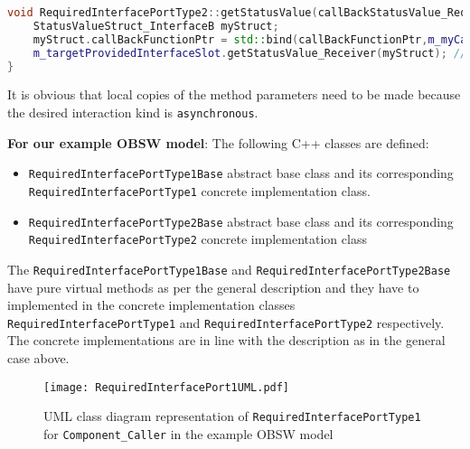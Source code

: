 \begin{Listing}
\begin{lstlisting}[language=C++]
void RequiredInterfacePortType2::getStatusValue(callBackStatusValue_RequiredInterfacePortType2 callBackFunctionPtr) {
	StatusValueStruct_InterfaceB myStruct; 
	myStruct.callBackFunctionPtr = std::bind(callBackFunctionPtr,m_myCallerInstance,std::placeholder::_1);
	m_targetProvidedInterfaceSlot.getStatusValue_Receiver(myStruct); //Simple method call
}
\end{lstlisting}
\caption{Code excerpt from the generated code for interface attribute \texttt{StatusValue} access in \texttt{Required\allowbreak InterfacePort\allowbreak Type2}}
\label{Listing: Required interface port2 Impl}
\end{Listing}

It is obvious that local copies of the method parameters need to be made because the desired interaction kind is \texttt{asynchronous}.             

\textbf{For our example OBSW model}: The following C++ classes are defined:
\begin{itemize}
\item \texttt{RequiredInterface\allowbreak PortType1Base} abstract base class and its corresponding \texttt{Required\allowbreak InterfacePort\allowbreak Type1} concrete implementation class.
\item \texttt{RequiredInterface\allowbreak PortType2Base} abstract base class and its corresponding \texttt{Required\allowbreak InterfacePort\allowbreak Type2} concrete implementation class
\end{itemize}

The \texttt{RequiredInterface\allowbreak PortType1Base} and \texttt{RequiredInterface\allowbreak PortType2Base} have pure virtual methods as per the general description and they have to implemented in the concrete implementation classes \texttt{Required\allowbreak InterfacePort\allowbreak Type1} and \texttt{Required\allowbreak InterfacePort\allowbreak Type2} respectively. The concrete implementations are in line with the description as in the general case above.

\begin{figure}[h]
	\centering
	\texttt{[image: RequiredInterfacePort1UML.pdf]}
	\caption{UML class diagram representation of \texttt{Required\allowbreak InterfacePort\allowbreak Type1} for \texttt{Component\allowbreak\_Caller} in the example OBSW model}
	\label{fig: Required interface port1 UML}
\end{figure}

